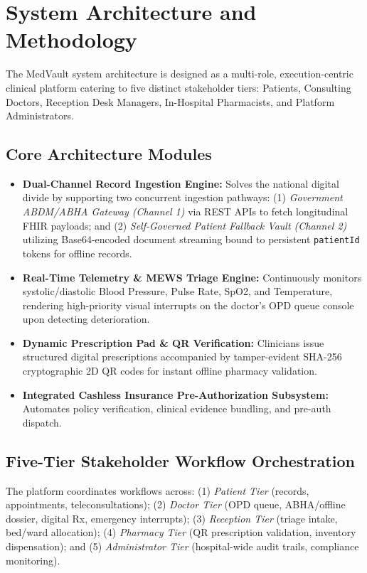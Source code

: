 \documentclass[conference]{IEEEtran}
\begin{document}
\section{System Architecture and Methodology}
The MedVault system architecture is designed as a multi-role, execution-centric clinical platform catering to five distinct stakeholder tiers: Patients, Consulting Doctors, Reception Desk Managers, In-Hospital Pharmacists, and Platform Administrators.

\subsection{Core Architecture Modules}
\begin{itemize}
    \item \textbf{Dual-Channel Record Ingestion Engine:} Solves the national digital divide by supporting two concurrent ingestion pathways: (1) \textit{Government ABDM/ABHA Gateway (Channel 1)} via REST APIs to fetch longitudinal FHIR payloads; and (2) \textit{Self-Governed Patient Fallback Vault (Channel 2)} utilizing Base64-encoded document streaming bound to persistent \texttt{patientId} tokens for offline records.
    \item \textbf{Real-Time Telemetry \& MEWS Triage Engine:} Continuously monitors systolic/diastolic Blood Pressure, Pulse Rate, SpO2, and Temperature, rendering high-priority visual interrupts on the doctor's OPD queue console upon detecting deterioration.
    \item \textbf{Dynamic Prescription Pad \& QR Verification:} Clinicians issue structured digital prescriptions accompanied by tamper-evident SHA-256 cryptographic 2D QR codes for instant offline pharmacy validation.
    \item \textbf{Integrated Cashless Insurance Pre-Authorization Subsystem:} Automates policy verification, clinical evidence bundling, and pre-auth dispatch.
\end{itemize}

\subsection{Five-Tier Stakeholder Workflow Orchestration}
The platform coordinates workflows across: (1) \textit{Patient Tier} (records, appointments, teleconsultations); (2) \textit{Doctor Tier} (OPD queue, ABHA/offline dossier, digital Rx, emergency interrupts); (3) \textit{Reception Tier} (triage intake, bed/ward allocation); (4) \textit{Pharmacy Tier} (QR prescription validation, inventory dispensation); and (5) \textit{Administrator Tier} (hospital-wide audit trails, compliance monitoring).
\end{document}
